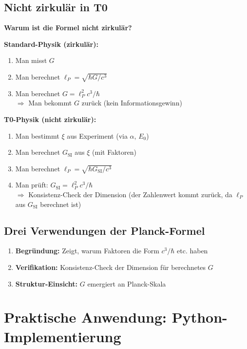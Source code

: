 	\subsection{Nicht zirkulär in T0}
	
	\textbf{Warum ist die Formel nicht zirkulär?}
	
	\textbf{Standard-Physik (zirkulär):}
	\begin{enumerate}
		\item Man misst $G$
		\item Man berechnet $\ell_P = \sqrt{\hbar G / c^3}$
		\item Man berechnet $G = \ell_P^2 c^3 / \hbar$ \\
		$\Rightarrow$ Man bekommt $G$ zurück (kein Informationsgewinn)
	\end{enumerate}
	
	\textbf{T0-Physik (nicht zirkulär):}
	\begin{enumerate}
		\item Man bestimmt $\xi$ aus Experiment (via $\alpha$, $E_0$)
		\item Man berechnet $G_{\text{SI}}$ aus $\xi$ (mit Faktoren)
		\item Man berechnet $\ell_P = \sqrt{\hbar G_{\text{SI}} / c^3}$
		\item Man prüft: $G_{\text{SI}} = \ell_P^2 c^3 / \hbar$ \\
		$\Rightarrow$ Konsistenz-Check der Dimension (der Zahlenwert kommt zurück, da $\ell_P$ aus $G_{\text{SI}}$ berechnet ist)
	\end{enumerate}
	
	\subsection{Drei Verwendungen der Planck-Formel}
	
	\begin{enumerate}
		\item \textbf{Begründung:} Zeigt, warum Faktoren die Form $c^3/\hbar$ etc. haben
		
		\item \textbf{Verifikation:} Konsistenz-Check der Dimension für berechnetes $G$
		
		\item \textbf{Struktur-Einsicht:} $G$ emergiert an Planck-Skala
	\end{enumerate}
	
	\section{Praktische Anwendung: Python-Implementierung}
	
